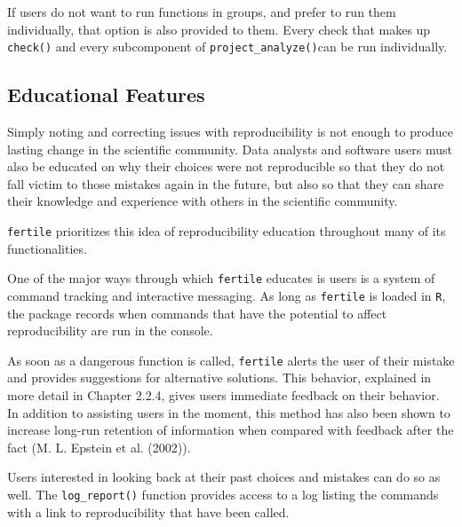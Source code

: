 \documentclass[12pt,twoside]{reedthesis}
\begin{document}
If users do not want to run functions in groups, and prefer to run them
individually, that option is also provided to them. Every check that
makes up \texttt{check()} and every subcomponent of
\texttt{project\_analyze()}can be run individually.

\subsection{Educational Features}\label{educational-features}

Simply noting and correcting issues with reproducibility is not enough
to produce lasting change in the scientific community. Data analysts and
software users must also be educated on why their choices were not
reproducible so that they do not fall victim to those mistakes again in
the future, but also so that they can share their knowledge and
experience with others in the scientific community.

\texttt{fertile} prioritizes this idea of reproducibility education
throughout many of its functionalities.

One of the major ways through which \texttt{fertile} educates is users
is a system of command tracking and interactive messaging. As long as
\texttt{fertile} is loaded in \texttt{R}, the package records when
commands that have the potential to affect reproducibility are run in
the console.

As soon as a dangerous function is called, \texttt{fertile} alerts the
user of their mistake and provides suggestions for alternative
solutions. This behavior, explained in more detail in Chapter 2.2.4,
gives users immediate feedback on their behavior. In addition to
assisting users in the moment, this method has also been shown to
increase long-run retention of information when compared with feedback
after the fact (M. L. Epstein et al. (2002)).

Users interested in looking back at their past choices and mistakes can
do so as well. The \texttt{log\_report()} function provides access to a
log listing the commands with a link to reproducibility that have been
called.
\end{document}
